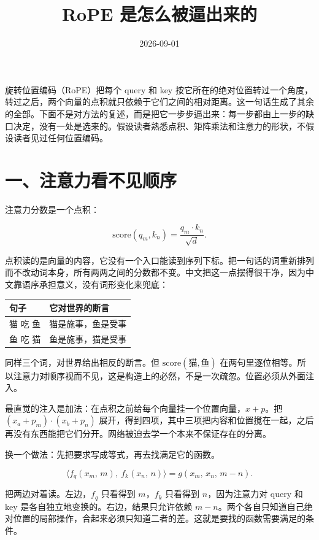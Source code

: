 

\title{RoPE 是怎么被逼出来的}
\date{2026-09-01}



旋转位置编码（RoPE）把每个 query 和 key 按它所在的绝对位置转过一个角度，转过之后，两个向量的点积就只依赖于它们之间的相对距离。这一句话生成了其余的全部。下面不是对方法的复述，而是把它一步步逼出来：每一步都由上一步的缺口决定，没有一处是选来的。假设读者熟悉点积、矩阵乘法和注意力的形状，不假设读者见过任何位置编码。

\section{一、注意力看不见顺序}

注意力分数是一个点积：

\[
\mathrm{score}(q_m, k_n) = \frac{q_m \cdot k_n}{\sqrt{d}}.
\]

点积读的是向量的内容，它没有一个入口能读到序列下标。把一句话的词重新排列而不改动词本身，所有两两之间的分数都不变。中文把这一点摆得很干净，因为中文靠语序承担意义，没有词形变化来兜底：

\begin{center}
\begin{tabular}{ll}
\hline
句子 & 它对世界的断言 \\
\hline
猫 吃 鱼 & 猫是施事，鱼是受事 \\
鱼 吃 猫 & 鱼是施事，猫是受事 \\
\hline
\end{tabular}
\end{center}

同样三个词，对世界给出相反的断言。但 $\mathrm{score}(\text{猫}, \text{鱼})$ 在两句里逐位相等。所以注意力对顺序视而不见，这是构造上的必然，不是一次疏忽。位置必须从外面注入。

最直觉的注入是加法：在点积之前给每个向量挂一个位置向量，$x + p$。把 $(x_a + p_m) \cdot (x_b + p_n)$ 展开，得到四项，其中三项把内容和位置搅在一起，之后再没有东西能把它们分开。网络被迫去学一个本来不保证存在的分离。

换一个做法：先把要求写成等式，再去找满足它的函数。

\[
\langle f_q(x_m,\, m),\ f_k(x_n,\, n) \rangle = g(x_m,\, x_n,\, m - n).
\]

把两边对着读。左边，$f_q$ 只看得到 $m$，$f_k$ 只看得到 $n$，因为注意力对 query 和 key 是各自独立地变换的。右边，结果只允许依赖 $m - n$。两个各自只知道自己绝对位置的局部操作，合起来必须只知道二者的差。这就是要找的函数需要满足的条件。

